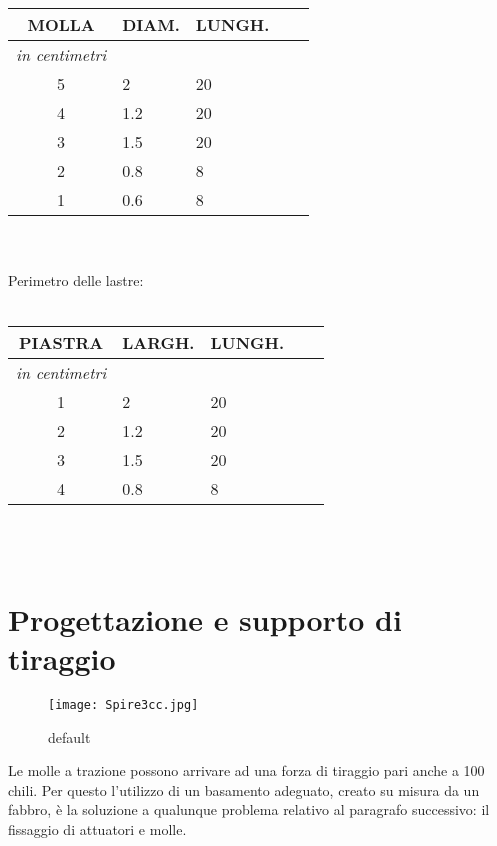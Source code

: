 \begin{tabular}{cp{2cm}p{2cm}p{.2cm}p{2cm}} \textbf{MOLLA}&\textbf{DIAM.}&\textbf{LUNGH.}\\
\hline \textit{in centimetri} \\
\hline 5&2&20\\
\hline 4&1.2&20\\
\hline 3&1.5&20\\
\hline 2&0.8&8\\
\hline 1&0.6&8\\
\end{tabular}
\\ \\
Perimetro delle lastre:
\\ \\
\begin{tabular}{cp{2cm}p{2cm}p{.2cm}p{2cm}} \textbf{PIASTRA}&\textbf{LARGH.}&\textbf{LUNGH.}\\
\hline \textit{in centimetri} \\
\hline 1&2&20\\
\hline 2&1.2&20\\
\hline 3&1.5&20\\
\hline 4&0.8&8\\
\end{tabular}
\\ \\

\section{Progettazione e supporto di tiraggio}


\begin{figure}[htbp]
\begin{center}
\texttt{[image: Spire3cc.jpg]}
\caption{default}
\label{default}
\end{center}
\end{figure}

Le molle a trazione possono arrivare ad una forza di tiraggio pari anche a 100 chili. Per questo l'utilizzo di un basamento adeguato, creato su misura da un fabbro, è la soluzione a qualunque problema relativo al paragrafo successivo: il fissaggio di attuatori e molle.

